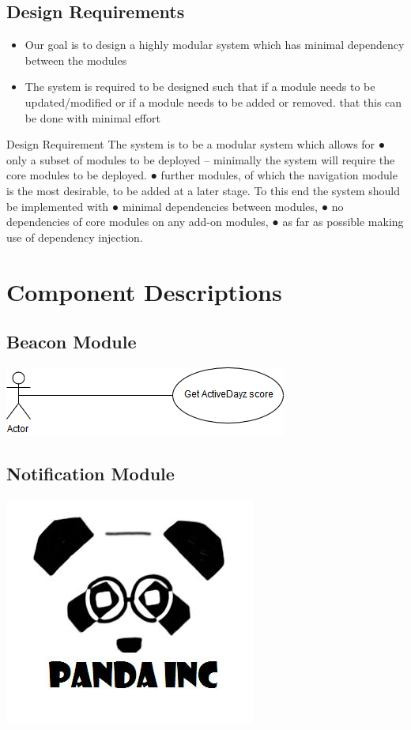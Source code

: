 \documentclass[11pt]{article}
\begin{document}
\subsection{Design Requirements}
\begin{itemize}
\item Our goal is to design a highly modular system which has minimal dependency between the modules
\item The system is required to be designed such that if a module needs to be updated/modified or if a module needs to be added or removed. that this can be done with minimal effort 
\end{itemize}



Design Requirement
The system is to be a modular system which allows for
● only a subset of modules to be deployed -- minimally the system will require
the core modules to be deployed.
● further modules, of which the navigation module is the most desirable, to be
added at a later stage.
To this end the system should be implemented with
● minimal dependencies between modules,
● no dependencies of core modules on any add-on modules,
● as far as possible making use of dependency injection.

\section{Component Descriptions}
\subsection{Beacon Module}
\includegraphics[width=0.7\linewidth]{Beacon.png}\\[1cm]
\subsection{Notification Module}
\includegraphics[width=0.7\linewidth]{panda.jpg}\\[1cm]
\end{document}
